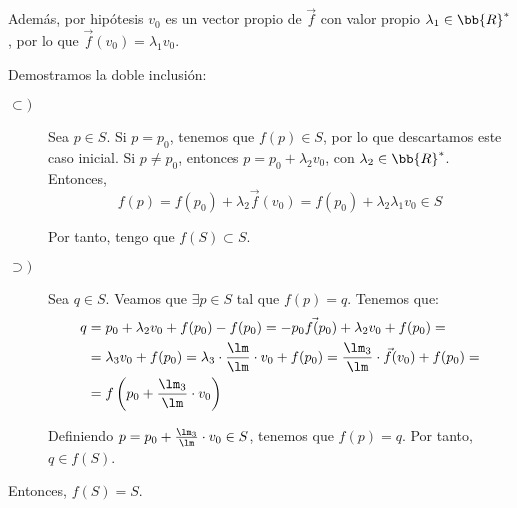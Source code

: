 \begin{ejercicio}
\begin{description}
        Además, por hipótesis $v_0$ es un vector propio de $\vec{f}$ con valor propio $\lambda_1\in \bb{R}^\ast$, por lo que $\vec{f}(v_0) = \lambda_1 v_0$.

        Demostramos la doble inclusión:
        \begin{description}
            \item[$\subset)$] Sea $p\in S$. Si $p=p_0$, tenemos que $f(p)\in S$, por lo que descartamos este caso inicial. Si $p\neq p_0$, entonces $p=p_0+\lambda_2 v_0$, con $\lambda_2 \in \bb{R}^\ast$. Entonces,
            \begin{equation*}
                f(p)=f(p_0) + \lambda_2\vec{f}(v_0) = f(p_0) +\lambda_2 \lambda_1 v_0\in S
            \end{equation*}

            Por tanto, tengo que $f(S)\subset S$.
            
            \item[$\supset)$] Sea $q\in S$. Veamos que $\exists p\in S$ tal que $f(p)=q$. Tenemos que:
            \begin{equation*}
                \begin{split}
                    q &= p_0+\lambda_2 v_0+f(p_0)-f(p_0) = -\vec{p_0f(p_0)} + \lambda_2 v_0 + f(p_0) =\\
                    &= \lambda_3 v_0 + f(p_0)
                    = \lambda_3\cdot \frac{\lm}{\lm}\cdot   v_0 + f(p_0) 
                    =\frac{\lm_3}{\lm}\cdot \vec{f}(v_0) + f(p_0) 
                    =\\&= f\left(p_0 + \frac{\lm_3}{\lm}\cdot v_0\right)
                \end{split}
            \end{equation*}

            Definiendo $p=p_0+\frac{\lm_3}{\lm}\cdot v_0\in S$, tenemos que $f(p)=q$. Por tanto, $q\in f(S)$.
        \end{description}

        Entonces, $f(S)=S$.        
    \end{description}
\end{ejercicio}


